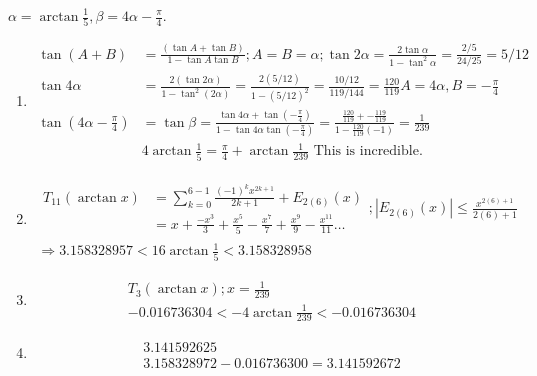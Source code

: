 \documentclass[twoside]{amsart}
\theoremstyle{plain}
\theoremstyle{definition}
\newcommand{\exercisehead}[1]
  {\smallskip
   \noindent{\small\bf Exercise #1.}}
\begin{document}
\exercisehead{10} $\alpha = \arctan{ \frac{1}{5} }, \beta = 4 \alpha - \frac{ \pi}{4} $.  
\begin{enumerate}
  \item 
    \[
    \begin{aligned}
      \tan{ (A+B)} &= \frac{ (\tan{A} + \tan{B} )}{ 1 - \tan{A} \tan{B} } ; A=B = \alpha; \tan{ 2\alpha} = \frac{ 2\tan{\alpha}}{ 1- \tan^2{\alpha}} = \frac{ 2/5}{ 24/25} = 5/12 \\
      \tan{ 4\alpha} & = \frac{ 2 (\tan{ 2\alpha})}{ 1-\tan^2{(2\alpha)} } = \frac{ 2 (5/12)}{ 1 - (5/12)^2 } = \frac{ 10/12}{119/144} = \frac{120}{119}
      A=4\alpha, B = -\frac{\pi}{4} & \\
      \tan{ (4\alpha - \frac{ \pi}{4} )} & = \tan{ \beta} = \frac{ \tan{4\alpha} + \tan{ \left( -\frac{\pi}{4} \right) } }{ 1 - \tan{ 4\alpha} \tan{ \left( -\frac{ \pi}{4} \right) } } = \frac{ \frac{ 120}{ 119} + - \frac{ 119}{119} }{ 1 - \frac{ 120}{119} (-1) } = \frac{ 1}{ 239 } \\
      & \boxed{ 4 \arctan{ \frac{1}{5}} = \frac{ \pi }{4} + \arctan{ \frac{1}{239} } } \text{ This is incredible. }
    \end{aligned}
\]
\item \[
\begin{gathered}
    \begin{aligned} 
    T_{11}(\arctan{x}) & = \sum_{k=0}^{6-1} \frac{ (-1)^k x^{2k+1}}{ 2k+1 } + E_{2(6)}(x) \\ & = x + \frac{ -x^3}{3} + \frac{ x^5}{5} - \frac{x^7}{7} + \frac{x^9}{9} - \frac{x^{11}}{11} \dots \end{aligned} ; |E_{2(6)}(x) | \leq \frac{ x^{2(6)+1}}{ 2(6)+1 } \\
    \Longrightarrow 3.158328957 < 16 \arctan{ \frac{1}{5} } < 3.158328958 
\end{gathered}
\]
\item 
\[
\begin{gathered}
  T_3(\arctan{x}); x = \frac{1}{239} \\
  -0.016736304 < -4 \arctan{ \frac{1}{239} } < -0.016736304
\end{gathered}
\]
\item 
\[
\begin{gathered}
3.141592625 \\
3.158328972-0.016736300=3.141592672
\end{gathered}
\]
\end{enumerate}

\end{document}
